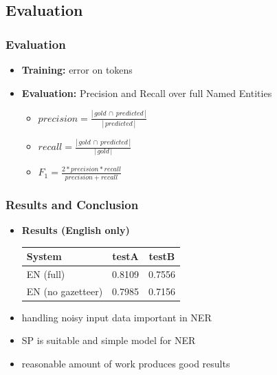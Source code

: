 \documentclass[10pt]{beamer}
\begin{document}
\begin{frame}
	
\section{Evaluation} %

\frametitle{Evaluation}
\begin{itemize}
	\item \textbf{Training:} error on tokens
	\item \textbf{Evaluation:} Precision and Recall over full Named Entities
	\begin{itemize}



		\item \vspace{0.3cm} $\displaystyle precision =  \frac{  |\,gold\,\cap\,predicted\,| }{ |\,predicted\,| }$ 
		\item \vspace{0.3cm} $\displaystyle recall = \frac{ |\,gold\,\cap\,predicted\,| }{ |\,gold\,| }$ 
		\item \vspace{0.3cm} $\displaystyle F_{1} = \frac{ 2 * precision*recall }{precision + recall} $ 
 

	\end{itemize}

\end{itemize}
\end{frame}




\begin{frame}
\frametitle{Results and Conclusion}
\begin{itemize}
\item \textbf{Results (English only)}\\
\begin{tabular}{l c c}
System                & testA & testB\\
\hline
EN (full)             & 0.8109 & 0.7556 \\
EN (no gazetteer)     & 0.7985 & 0.7156\\
\end{tabular} 
\vspace{0.3cm}
\item handling noisy input data important in NER
\item SP is suitable and simple model for NER 
\item reasonable amount of work produces good results 


\end{itemize}
\end{frame}
\end{document}
